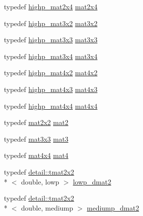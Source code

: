 \begin{DoxyCompactItemize}
\item 
typedef \hyperlink{group__core__precision_ga3cc506666b7a95db56f9d2eb787b6e20}{highp\-\_\-mat2x4} \hyperlink{group__core__types_gaa9bfb36efaf88ecad32369ec8a01d901}{mat2x4}
\item 
typedef \hyperlink{group__core__precision_gabc7767293ff69cd56717ee9d8be62963}{highp\-\_\-mat3x2} \hyperlink{group__core__types_gad7476e0e866186f12ee87975c6b01552}{mat3x2}
\item 
typedef \hyperlink{group__core__precision_ga8a3703cc71cdfc8928eddf46b3763c4b}{highp\-\_\-mat3x3} \hyperlink{group__core__types_ga6fecca6a869070b6bf8acb44ce1c2af3}{mat3x3}
\item 
typedef \hyperlink{group__core__precision_gabaf9c8dd35db715b1093042703f879d0}{highp\-\_\-mat3x4} \hyperlink{group__core__types_ga5524ae15d7fc00a68b8e0e3a0733cc2a}{mat3x4}
\item 
typedef \hyperlink{group__core__precision_gadf9c4a7947c2b0a79f52cc86a860f270}{highp\-\_\-mat4x2} \hyperlink{group__core__types_ga72cf8ec4f4cda85943f4683531e421bc}{mat4x2}
\item 
typedef \hyperlink{group__core__precision_gab8dfe989c5100c35ab5dec0e94f59d2a}{highp\-\_\-mat4x3} \hyperlink{group__core__types_gad3f3f750dcdc74a9037342c5cae55f5e}{mat4x3}
\item 
typedef \hyperlink{group__core__precision_ga231950d260be295a25d7340e2020f55c}{highp\-\_\-mat4x4} \hyperlink{group__core__types_ga63e3ee9447ed593484140a9368e738ec}{mat4x4}
\item 
typedef \hyperlink{group__core__types_gaeddc14adb4963d9bad73866cc202fb40}{mat2x2} \hyperlink{group__core__types_ga8357ec0aab6f8cf69313592492663c3f}{mat2}
\item 
typedef \hyperlink{group__core__types_ga6fecca6a869070b6bf8acb44ce1c2af3}{mat3x3} \hyperlink{group__core__types_gadfaff2a7dce5cbf4e77a47ecea42ac5b}{mat3}
\item 
typedef \hyperlink{group__core__types_ga63e3ee9447ed593484140a9368e738ec}{mat4x4} \hyperlink{group__core__types_ga7dcd2365c2e368e6af5b7adeb6a9c8df}{mat4}
\item 
typedef \hyperlink{structglm_1_1detail_1_1tmat2x2}{detail\-::tmat2x2}\\*
$<$ double, lowp $>$ \hyperlink{group__core__precision_ga5e08c45dfef867e0326a1eee95060cd0}{lowp\-\_\-dmat2}
\item 
typedef \hyperlink{structglm_1_1detail_1_1tmat2x2}{detail\-::tmat2x2}\\*
$<$ double, mediump $>$ \hyperlink{group__core__precision_gac056ec9d1c37e591172544088163b7e4}{mediump\-\_\-dmat2}

\end{DoxyCompactItemize}
